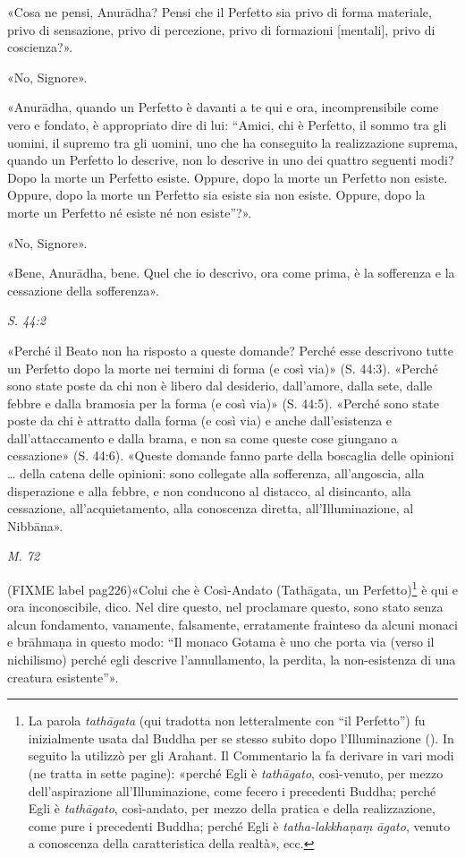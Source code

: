 «Cosa ne pensi, Anurādha? Pensi che il Perfetto sia privo di forma
materiale, privo di sensazione, privo di percezione, privo di formazioni
[mentali], privo di coscienza?».


«No, Signore».


«Anurādha, quando un Perfetto è davanti a te qui e ora, incomprensibile
come vero e fondato, è appropriato dire di lui: “Amici, chi è Perfetto,
il sommo tra gli uomini, il supremo tra gli uomini, uno che ha
conseguito la realizzazione suprema, quando un Perfetto lo descrive, non
lo descrive in uno dei quattro seguenti modi? Dopo la morte un Perfetto
esiste. Oppure, dopo la morte un Perfetto non esiste. Oppure, dopo la
morte un Perfetto sia esiste sia non esiste. Oppure, dopo la morte un
Perfetto né esiste né non esiste”?».


«No, Signore».


«Bene, Anurādha, bene. Quel che io descrivo, ora come prima, è la
sofferenza e la cessazione della sofferenza».


\emph{S. 44:2}


«Perché il Beato non ha risposto a queste domande? Perché esse
descrivono tutte un Perfetto dopo la morte nei termini di forma (e così
via)» (S. 44:3). «Perché sono state poste da chi non è libero dal
desiderio, dall’amore, dalla sete, dalle febbre e dalla bramosia per la
forma (e così via)» (S. 44:5). «Perché sono state poste da chi è
attratto dalla forma (e così via) e anche dall’esistenza e
dall’attaccamento e dalla brama, e non sa come queste cose giungano a
cessazione» (S. 44:6). «Queste domande fanno parte della boscaglia delle
opinioni … della catena delle opinioni: sono collegate alla sofferenza,
all’angoscia, alla disperazione e alla febbre, e non conducono al
distacco, al disincanto, alla cessazione, all’acquietamento, alla
conoscenza diretta, all’Illuminazione, al Nibbāna».


\emph{M. 72}


(FIXME label pag226)«Colui che è Così-Andato (Tathāgata, un Perfetto)\footnote{La parola \emph{tathāgata} (qui tradotta non letteralmente con “il Perfetto”) fu inizialmente usata dal Buddha per se stesso subito dopo l’Illuminazione (\hyperlink{cap-03-Dopo-l-Illuminazione#pag41}{}). In seguito la utilizzò per gli Arahant. Il Commentario la fa derivare in vari modi (ne tratta in sette pagine): «perché Egli è \emph{tathāgato}, così-venuto, per mezzo dell’aspirazione all’Illuminazione, come fecero i precedenti Buddha; perché Egli è \emph{tathāgato}, così-andato, per mezzo della pratica e della realizzazione, come pure i precedenti Buddha; perché Egli è \emph{tatha-lakkhaṇaṃ āgato}, venuto a conoscenza della caratteristica della realtà», ecc.} è qui
e ora inconoscibile, dico. Nel dire questo, nel proclamare questo, sono
stato senza alcun fondamento, vanamente, falsamente, erratamente
frainteso da alcuni monaci e brāhmaṇa in questo modo: “Il monaco Gotama
è uno che porta via (verso il nichilismo) perché egli descrive
l’annullamento, la perdita, la non-esistenza di una creatura
esistente”».


